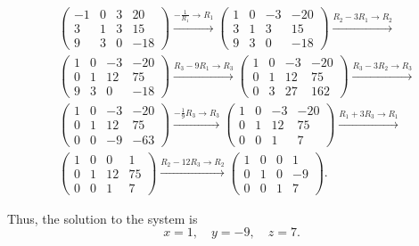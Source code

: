 {\begin{answer}
								\begin{align*}
									&
									\left(\begin{array}{ccc|c}
											-1 & 0 & 3 & 20\\
											3  & 1 & 3 & 15\\
											9  & 3 & 0 & -18
									\end{array}\right) \xrightarrow[] {-\frac{1}{R_{1}} \rightarrow R_{1}}
									\left(\begin{array}{ccc|c}
											1 & 0 & -3 & -20\\
											3  & 1 & 3 & 15\\
											9  & 3 & 0 & -18
									\end{array}\right) \xrightarrow[] {R_{2}-3R_{1} \rightarrow R_{2}}\\
									&
									\left(\begin{array}{ccc|c}
											1 & 0 & -3 & -20\\
											0  & 1 & 12 & 75\\
											9  & 3 & 0 & -18
									\end{array}\right) \xrightarrow[] {R_{3}-9R_{1} \rightarrow R_{3}}
									\left(\begin{array}{ccc|c}
											1 & 0 & -3 & -20\\
											0  & 1 & 12 & 75\\
											0  & 3 & 27 & 162
									\end{array}\right) \xrightarrow[] {R_{3}-3R_{2} \rightarrow R_{3}}\\
									&
									\left(\begin{array}{ccc|c}
											1 & 0 & -3 & -20\\
											0  & 1 & 12 & 75\\
											0  & 0 & -9 & -63 
									\end{array}\right) \xrightarrow[] {-\frac{1}{9}R_{3} \rightarrow R_{3}}
									\left(\begin{array}{ccc|c}
											1 & 0 & -3 & -20\\
											0  & 1 & 12 & 75\\
											0  & 0 & 1 & 7 
									\end{array}\right) \xrightarrow[] {R_{1}+3R_{3} \rightarrow R_{1}}\\
									&
									\left(\begin{array}{ccc|c}
											1 & 0 & 0 & 1\\
											0  & 1 & 12 & 75\\
											0  & 0 & 1 & 7 
									\end{array}\right) \xrightarrow[] {R_{2}-12R_{3} \rightarrow R_{2}}
									\left(\begin{array}{ccc|c}
											1 & 0 & 0 & 1\\
											0  & 1 & 0 & -9\\
											0  & 0 & 1 & 7 
									\end{array}\right).
								\end{align*}

								Thus, the solution to the system is
								\begin{equation*}
									x=1,\quad y=-9,\quad z=7.
								\end{equation*}
							\end{answer}
						}\fi
